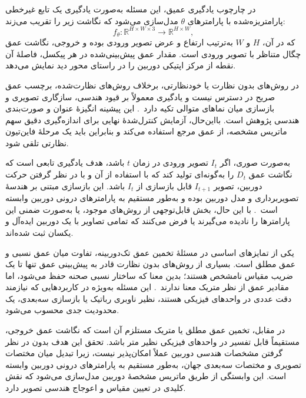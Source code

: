 در چارچوب یادگیری عمیق، این مسئله به‌صورت یادگیری یک تابع غیرخطی پارامتریزه‌شده با پارامترهای $\theta$ مدل‌سازی می‌شود که نگاشت زیر را تقریب می‌زند:
\begin{equation}
f_{\theta} : \mathbb{R}^{H \times W \times 3} \rightarrow \mathbb{R}^{H \times W},
\end{equation}
که در آن، $H$ و $W$ به‌ترتیب ارتفاع و عرض تصویر ورودی بوده و خروجی، نگاشت عمق چگال متناظر با تصویر ورودی است. مقدار عمق پیش‌بینی‌شده در هر پیکسل، فاصلهٔ آن نقطه از مرکز اپتیکی دوربین را در راستای محور دید نمایش می‌دهد.

در روش‌های بدون نظارت یا خودنظارتی، برخلاف روش‌های نظارت‌شده، برچسب عمق صریح در دسترس نیست و یادگیری معمولاً بر قیود هندسی، سازگاری تصویری و بازسازی میان نماهای متوالی تکیه دارد~\cite{Zhou2017Unsupervised,Godard2017Unsupervised}. این پیشینه انگیزهٔ عنوان و صورت‌بندی هندسی پژوهش است. بااین‌حال، آزمایش کنترل‌شدهٔ نهایی برای اندازه‌گیری دقیق سهم ماتریس مشخصه، از عمق مرجع استفاده می‌کند و بنابراین باید یک مرحلهٔ فاین‌تیون نظارتی تلقی شود.

به‌صورت صوری، اگر $I_t$ تصویر ورودی در زمان $t$ باشد، هدف یادگیری تابعی است که نگاشت عمق $D_t$ را به‌گونه‌ای تولید کند که با استفاده از آن و با در نظر گرفتن حرکت دوربین، تصویر $I_{t+1}$ قابل بازسازی از $I_t$ باشد. این بازسازی مبتنی بر هندسهٔ تصویربرداری و مدل دوربین بوده و به‌طور مستقیم به پارامترهای درونی دوربین وابسته است~\cite{HartleyZisserman2004}. با این حال، بخش قابل‌توجهی از روش‌های موجود، یا به‌صورت ضمنی این پارامترها را نادیده می‌گیرند یا فرض می‌کنند که تمامی تصاویر با یک دوربین ایده‌آل و یکسان ثبت شده‌اند.

یکی از تمایزهای اساسی در مسئلهٔ تخمین عمق تک‌دوربینه، تفاوت میان عمق نسبی و عمق مطلق است. بسیاری از روش‌های بدون نظارت قادر به پیش‌بینی عمق تنها تا یک ضریب مقیاس نامشخص هستند؛ بدین معنا که ساختار نسبی صحنه حفظ می‌شود، اما مقادیر عمق از نظر متریک معنا ندارند~\cite{Zhou2017Unsupervised,Godard2019Digging,Ranftl2019Robust}. این مسئله به‌ویژه در کاربردهایی که نیازمند دقت عددی در واحدهای فیزیکی هستند، نظیر ناوبری رباتیک یا بازسازی سه‌بعدی، یک محدودیت جدی محسوب می‌شود.

در مقابل، تخمین عمق مطلق یا متریک مستلزم آن است که نگاشت عمق خروجی، مستقیماً قابل تفسیر در واحدهای فیزیکی نظیر متر باشد. تحقق این هدف بدون در نظر گرفتن مشخصات هندسی دوربین عملاً امکان‌پذیر نیست، زیرا تبدیل میان مختصات تصویری و مختصات سه‌بعدی جهان، به‌طور مستقیم به پارامترهای درونی دوربین وابسته است. این وابستگی از طریق ماتریس مشخصهٔ دوربین مدل‌سازی می‌شود که نقش کلیدی در تعیین مقیاس و اعوجاج هندسی تصویر دارد.

